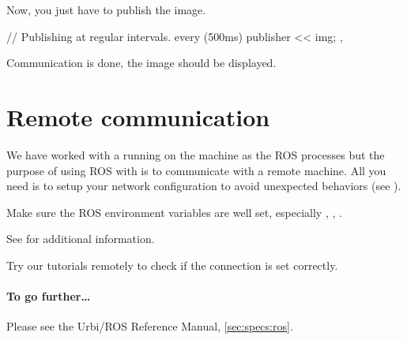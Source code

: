 Now, you just have to publish the image.

\begin{urbiunchecked}
// Publishing at regular intervals.
every (500ms)
{
  publisher << img;
},
\end{urbiunchecked}

Communication is done, the image should be displayed.

\section{Remote communication}

We have worked with a  running on the machine as the ROS
processes but the purpose of using ROS with \urbi is to communicate with a
remote machine.  All you need is to setup your network configuration to
avoid unexpected behaviors (see ).

Make sure the ROS environment variables are well set, especially
, , .

See  for additional information.

Try our tutorials remotely to check if the connection is set correctly.

\paragraph{To go further\ldots}
Please see the Urbi/ROS Reference Manual, \autoref{sec:specs:ros}.


